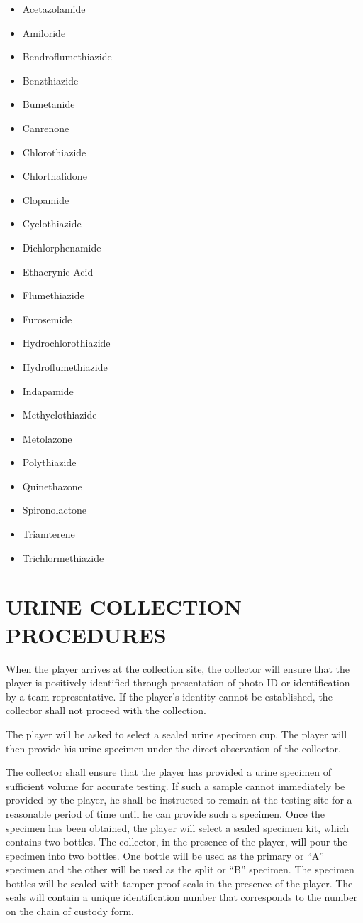 \documentclass[
]{book}
\providecommand{\tightlist}{%
  \setlength{\itemsep}{0pt}\setlength{\parskip}{0pt}}
\begin{document}
\begin{itemize}
\tightlist
\item
  Acetazolamide
\item
  Amiloride
\item
  Bendroflumethiazide
\item
  Benzthiazide
\item
  Bumetanide
\item
  Canrenone
\item
  Chlorothiazide
\item
  Chlorthalidone
\item
  Clopamide
\item
  Cyclothiazide
\item
  Dichlorphenamide
\item
  Ethacrynic Acid
\item
  Flumethiazide
\item
  Furosemide
\item
  Hydrochlorothiazide
\item
  Hydroflumethiazide
\item
  Indapamide
\item
  Methyclothiazide
\item
  Metolazone
\item
  Polythiazide
\item
  Quinethazone
\item
  Spironolactone
\item
  Triamterene
\item
  Trichlormethiazide
\end{itemize}

\hypertarget{urine-collection-procedures}{%
\section{URINE COLLECTION PROCEDURES}\label{urine-collection-procedures}}

When the player arrives at the collection site, the collector will ensure that the player is positively identified through presentation of photo ID or identification by a team representative. If the player's identity cannot be established, the collector shall not proceed with the collection.

The player will be asked to select a sealed urine specimen cup. The player will then provide his urine specimen under the direct observation of the collector.

The collector shall ensure that the player has provided a urine specimen of sufficient volume for accurate testing. If such a sample cannot immediately be provided by the player, he shall be instructed to remain at the testing site for a reasonable period of time until he can provide such a specimen. Once the specimen has been obtained, the player will select a sealed specimen kit, which contains two bottles. The collector, in the presence of the player, will pour the specimen into two bottles. One bottle will be used as the primary or ``A'' specimen and the other will be used as the split or ``B'' specimen. The specimen bottles will be sealed with tamper-proof seals in the presence of the player. The seals will contain a unique identification number that corresponds to the number on the chain of custody form.
\end{document}
